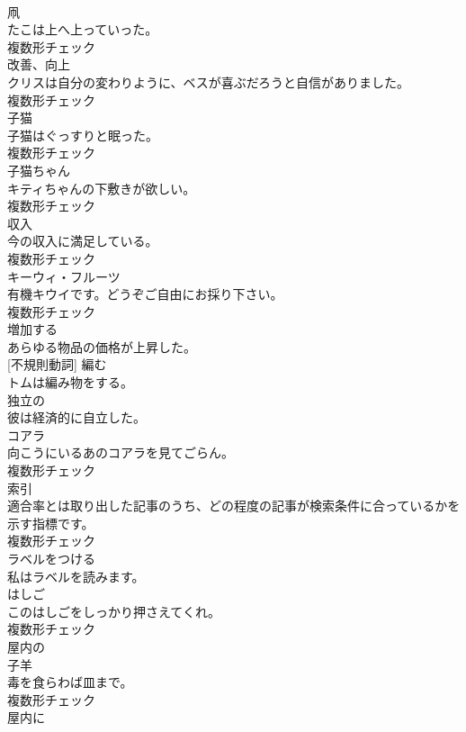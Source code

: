 \documentclass[8pt]{extreport}
\begin{document}
\begin{CJK}{UTF8}{min}
\\	[名詞]	凧	
\\	たこは上へ上っていった。	
\\	複数形チェック
\\	[名詞]	改善、向上	
\\	クリスは自分の変わりように、ベスが喜ぶだろうと自信がありました。	
\\	複数形チェック
\\	[名詞]	子猫	
\\	子猫はぐっすりと眠った。	
\\	複数形チェック
\\	[名詞]	子猫ちゃん	
\\	キティちゃんの下敷きが欲しい。	
\\	複数形チェック
\\	[名詞]	収入	
\\	今の収入に満足している。	
\\	複数形チェック
\\	[名詞]	キーウィ・フルーツ	
\\	有機キウイです。どうぞご自由にお採り下さい。	
\\	複数形チェック
\\	[動詞]	増加する	
\\	あらゆる物品の価格が上昇した。	
\\	[動詞] [不規則動詞]	編む	
\\	トムは編み物をする。	
\\	[形容詞]	独立の	
\\	彼は経済的に自立した。	
\\	[名詞]	コアラ	
\\	向こうにいるあのコアラを見てごらん。	
\\	複数形チェック
\\	[名詞]	索引	
\\	適合率とは取り出した記事のうち、どの程度の記事が検索条件に合っているかを示す指標です。	
\\	複数形チェック
\\	[動詞]	ラベルをつける	
\\	私はラベルを読みます。	
\\	[名詞]	はしご	
\\	このはしごをしっかり押さえてくれ。	
\\	複数形チェック
\\	[形容詞]	屋内の	
\\	[名詞]	子羊	
\\	毒を食らわば皿まで。	
\\	複数形チェック
\\	[副詞]	屋内に	

\end{CJK}
\end{document}
